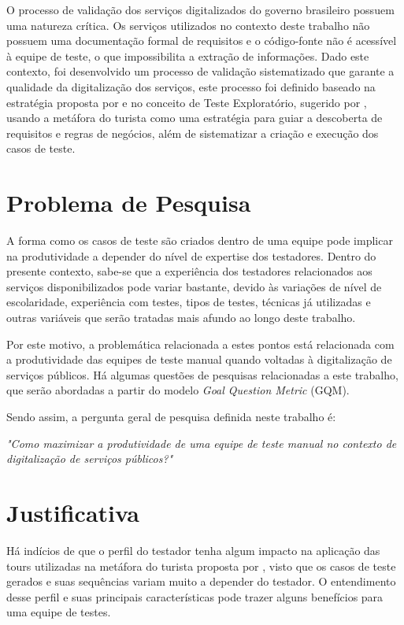O processo de validação dos serviços digitalizados do governo brasileiro possuem uma natureza crítica. Os serviços utilizados no
contexto deste trabalho não possuem uma documentação formal de requisitos e o código-fonte não é acessível à equipe de teste, o que
impossibilita a extração de informações. Dado este contexto, foi desenvolvido um processo de validação sistematizado que garante
a qualidade da digitalização dos serviços, este processo foi definido baseado na estratégia proposta por \cite{elcock2006testing} e
no conceito de Teste Exploratório, sugerido por \cite{whittaker2009exploratory}, usando a metáfora do turista como uma estratégia
para guiar a descoberta de requisitos e regras de negócios, além de sistematizar a criação e execução dos casos de teste.

\section{Problema de Pesquisa}

A forma como os casos de teste são criados dentro de uma equipe pode implicar na produtividade a depender do nível de expertise dos
testadores. Dentro do presente contexto, sabe-se que a experiência dos testadores relacionados aos serviços disponibilizados
pode variar bastante, devido às variações de nível de escolaridade, experiência com testes, tipos de testes, técnicas já utilizadas
e outras variáveis que serão tratadas mais afundo ao longo deste trabalho.

Por este motivo, a problemática relacionada a estes pontos está relacionada com a produtividade das equipes de teste manual quando
voltadas à digitalização de serviços públicos. Há algumas questões de pesquisas relacionadas a este trabalho, que serão abordadas a partir do modelo
\textit{Goal Question Metric} (GQM).

Sendo assim, a pergunta geral de pesquisa definida neste trabalho é:

\textit{"Como maximizar a produtividade de uma equipe de teste manual no contexto de digitalização de serviços públicos?"}

\section{Justificativa}

Há indícios de que o perfil do testador tenha algum impacto na aplicação das tours utilizadas na metáfora do turista proposta por
\cite{whittaker2009exploratory}, visto que os casos de teste gerados e suas sequências variam muito a depender do testador.
O entendimento desse perfil e suas principais características pode trazer alguns benefícios para uma equipe de testes.

